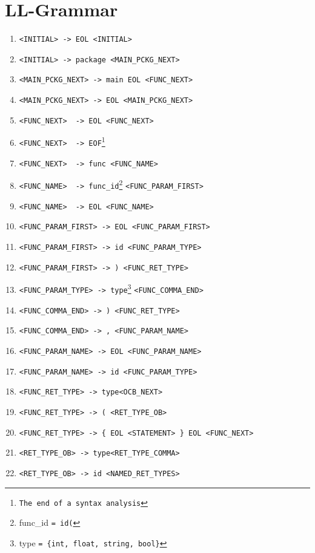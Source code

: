 \documentclass[12pt]{article}
\begin{document}
\newpage
\appendix

\section{LL-Grammar}
\label{sec:llgrammar}
\begin{enumerate}
	\item \verb=<INITIAL> -> EOL <INITIAL>=
	\item \verb=<INITIAL> -> package <MAIN_PCKG_NEXT>=
	\item \verb=<MAIN_PCKG_NEXT> -> main EOL <FUNC_NEXT>=
	\item \verb=<MAIN_PCKG_NEXT> -> EOL <MAIN_PCKG_NEXT>=
	\item \verb=<FUNC_NEXT>  -> EOL <FUNC_NEXT>=
	\item \verb=<FUNC_NEXT>  -> EOF=\footnote[1]{\texttt{The end of a syntax analysis}}
	\item \verb=<FUNC_NEXT>  -> func <FUNC_NAME>=
	\item \verb=<FUNC_NAME>  -> func_id=\footnote[2]{func\_id \texttt{= id(}} \verb=<FUNC_PARAM_FIRST>=
	\item \verb=<FUNC_NAME>  -> EOL <FUNC_NAME>=
	\item \verb=<FUNC_PARAM_FIRST> -> EOL <FUNC_PARAM_FIRST>=
	\item \verb=<FUNC_PARAM_FIRST> -> id <FUNC_PARAM_TYPE>=	
	\item \verb=<FUNC_PARAM_FIRST> -> ) <FUNC_RET_TYPE>=
	\item \verb=<FUNC_PARAM_TYPE> -> type=\footnote[3]{ type \texttt{= \{int, float, string, bool\}}} \verb=<FUNC_COMMA_END>=
	\item \verb=<FUNC_COMMA_END> -> ) <FUNC_RET_TYPE>=
	\item \verb=<FUNC_COMMA_END> -> , <FUNC_PARAM_NAME>=
	\item \verb=<FUNC_PARAM_NAME> -> EOL <FUNC_PARAM_NAME>=
	\item \verb=<FUNC_PARAM_NAME> -> id <FUNC_PARAM_TYPE>=	
	\item \verb=<FUNC_RET_TYPE> -> type=\footnotemark[3] \verb=<OCB_NEXT>=
	\item \verb=<FUNC_RET_TYPE> -> ( <RET_TYPE_OB>=
	\item \verb=<FUNC_RET_TYPE> -> { EOL <STATEMENT> } EOL <FUNC_NEXT>=
	\item \verb=<RET_TYPE_OB> -> type=\footnotemark[3] \verb=<RET_TYPE_COMMA>=
	\item \verb=<RET_TYPE_OB> -> id <NAMED_RET_TYPES>=

\end{enumerate}
\end{document}
